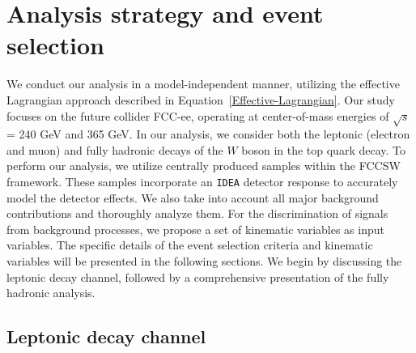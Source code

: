 \documentclass[11pt,onecolumn,english,showpacs,preprintnumbers,amsmath,amssymb,floatfix,nofootinbib]{revtex4-1}
\begin{document}
\section{Analysis strategy and event selection}\label{sec:strategy}
%
We conduct our analysis in a model-independent manner, utilizing the effective Lagrangian approach described in Equation~\eqref{Effective-Lagrangian}. Our study focuses on the future collider FCC-ee, operating at center-of-mass energies of $\sqrt{s}$ = 240 GeV and 365 GeV. In our analysis, we consider both the leptonic (electron and muon) and fully hadronic decays of the $W$ boson in the top quark decay.
To perform our analysis, we utilize centrally produced samples within the FCCSW framework. These samples incorporate an {\tt IDEA} detector response to accurately model the detector effects. We also take into account all major background contributions and thoroughly analyze them.
For the discrimination of signals from background processes, we propose a set of kinematic variables as input variables. The specific details of the event selection criteria and kinematic variables will be presented in the following sections. We begin by discussing the leptonic decay channel, followed by a comprehensive presentation of the fully hadronic analysis.
%
\subsection{Leptonic decay channel}\label{Leptonic-decay-channel}
%
\end{document}
